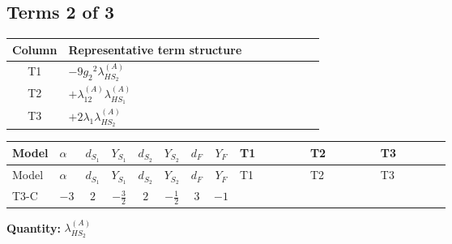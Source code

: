 \documentclass[8pt]{article}
\begin{document}
\begin{landscape}
\subsection*{Terms 2 of 3}
\begin{center}
\begin{tabular}{@{}c >{\raggedright\arraybackslash}p{0.82\linewidth}@{}}
\toprule
Column & Representative term structure \\
\midrule
T1 & \(\displaystyle -9 {g_2}^2 {\lambda_{HS_2}^{(A)}}\) \\
\midrule
T2 & \(\displaystyle +{\lambda_{12}^{(A)}} {\lambda_{HS_1}^{(A)}}\) \\
\midrule
T3 & \(\displaystyle +2 {\lambda_1} {\lambda_{HS_2}^{(A)}}\) \\
\midrule
\bottomrule
\end{tabular}
\end{center}
\smallskip
\tiny
\begin{longtable}{@{}llcccccc >{\raggedright\arraybackslash}p{0.21\linewidth} >{\raggedright\arraybackslash}p{0.21\linewidth} >{\raggedright\arraybackslash}p{0.21\linewidth}@{}}
\toprule
Model & $\alpha$ & $d_{S_1}$ & $Y_{S_1}$ & $d_{S_2}$ & $Y_{S_2}$ & $d_F$ & $Y_F$ & T1 & T2 & T3 \\
\midrule
\endfirsthead
\toprule
Model & $\alpha$ & $d_{S_1}$ & $Y_{S_1}$ & $d_{S_2}$ & $Y_{S_2}$ & $d_F$ & $Y_F$ & T1 & T2 & T3 \\
\midrule
\endhead
T3-C & $-3$ & $2$ & $-\frac{3}{2}$ & $2$ & $-\frac{1}{2}$ & $3$ & $-1$ & \scriptsize\adjustbox{max width=\linewidth}{$\begin{gathered} -9 {g_2}^2 {\lambda_{HS_2}^{(A)}}\end{gathered}$} & \scriptsize\adjustbox{max width=\linewidth}{$\begin{gathered} +{\lambda_{12}^{(A)}} {\lambda_{HS_1}^{(A)}}\end{gathered}$} & \scriptsize\adjustbox{max width=\linewidth}{$\begin{gathered} +2 {\lambda_1} {\lambda_{HS_2}^{(A)}}\end{gathered}$} \\
\midrule
\bottomrule
\end{longtable}
\clearpage
\noindent\textbf{Quantity: }$\lambda_{HS_2}^{(A)}$\par\smallskip

\end{landscape}
\end{document}
